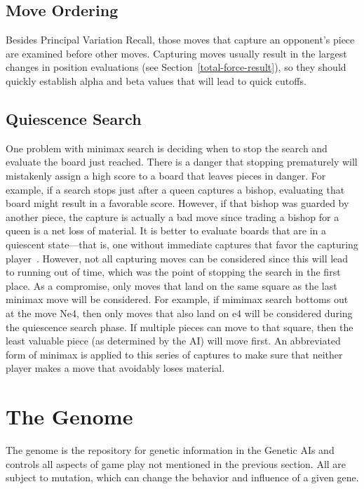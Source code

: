 \documentclass[letterpaper]{article}
\renewcommand{\_}{\allowbreak\textunderscore\allowbreak}
\begin{document}
\subsection{Move Ordering}

Besides Principal Variation Recall, those moves that capture an opponent's piece are examined before other moves. Capturing moves usually result in the largest changes in position evaluations (see Section~\ref{total-force-result}), so they should quickly establish alpha and beta values that will lead to quick cutoffs.

\subsection{Quiescence Search}

One problem with minimax search is deciding when to stop the search and evaluate the board just reached. There is a danger that stopping prematurely will mistakenly assign a high score to a board that leaves pieces in danger. For example, if a search stops just after a queen captures a bishop, evaluating that board might result in a favorable score. However, if that bishop was guarded by another piece, the capture is actually a bad move since trading a bishop for a queen is a net loss of material. It is better to evaluate boards that are in a quiescent state---that is, one without immediate captures that favor the capturing player~\cite{quiescence-ref}. However, not all capturing moves can be considered since this will lead to running out of time, which was the point of stopping the search in the first place. As a compromise, only moves that land on the same square as the last minimax move will be considered. For example, if mimimax search bottoms out at the move Ne4, then only moves that also land on e4 will be considered during the quiescence search phase. If multiple pieces can move to that square, then the least valuable piece (as determined by the AI) will move first. An abbreviated form of minimax is applied to this series of captures to make sure that neither player makes a move that avoidably loses material.

\section{The Genome}\label{gene-section}

The genome is the repository for genetic information in the Genetic AIs and controls all aspects of game play not mentioned in the previous section. All are subject to mutation, which can change the behavior and influence of a given gene.
\end{document}
